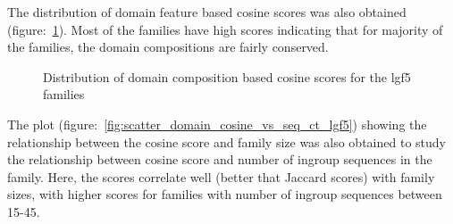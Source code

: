 \documentclass{article}
\begin{document}
		The distribution of domain feature based cosine scores was also obtained (figure:~\ref{fig:hist_domain_cosine_scores_lgf5}). Most of the families have high scores indicating that for majority of the families, the domain compositions are fairly conserved. 
		
		\begin{figure}
			\caption{Distribution of domain composition based cosine scores for the lgf5 families}
			\label{fig:hist_domain_cosine_scores_lgf5}
		\end{figure}
		
		The plot (figure:~\ref{fig:scatter_domain_cosine_vs_seq_ct_lgf5}) showing the relationship between the cosine score and family size was also obtained to study the relationship between cosine score and number of ingroup sequences in the family. Here, the scores correlate well (better that Jaccard scores) with family sizes, with higher scores for families with number of ingroup sequences between 15-45.
		
\end{document}

